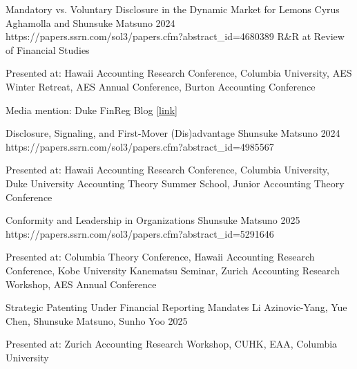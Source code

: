 \paperentry
	{Mandatory vs. Voluntary Disclosure in the Dynamic Market for Lemons}   %
	{Cyrus Aghamolla and Shunsuke Matsuno}   %
	{2024}   %
	{https://papers.ssrn.com/sol3/papers.cfm?abstract_id=4680389}  %
	{}   %
	{R\&R at Review of Financial Studies}   %
	{
	\begin{cvitems}  %
		\item {Presented at: Hawaii Accounting Research Conference\co, Columbia University, AES Winter Retreat\co, AES Annual Conference, Burton Accounting Conference\co} 
		\item {Media mention: Duke FinReg Blog \href{https://sites.duke.edu/thefinregblog/2024/10/29/mandatory-vs-voluntary-disclosure-in-the-dynamic-market-for-lemons/}{[link]}}
	\end{cvitems}
	}
	{}

\paperentry
	{Disclosure, Signaling, and First-Mover (Dis)advantage}   %
	{Shunsuke Matsuno}   %
	{2024}
	{https://papers.ssrn.com/sol3/papers.cfm?abstract_id=4985567}  %
	{}   %
	{}   %
	{
	\begin{cvitems}  %
		\item {Presented at: Hawaii Accounting Research Conference, Columbia University, Duke University Accounting Theory Summer School, Junior Accounting Theory Conference}
	\end{cvitems}
	}
	{}

\paperentry
	{Conformity and Leadership in Organizations}
	{Shunsuke Matsuno}
	{2025}
	{https://papers.ssrn.com/sol3/papers.cfm?abstract_id=5291646}
	{}
	{}
	{
	\begin{cvitems} %
		\item {Presented at: Columbia Theory Conference, Hawaii Accounting Research Conference, Kobe University Kanematsu Seminar, Zurich Accounting Research Workshop, AES Annual Conference}
	\end{cvitems}
	}
	{}

\paperentry
	{Strategic Patenting Under Financial Reporting Mandates}
	{Li Azinovic-Yang, Yue Chen, Shunsuke Matsuno, Sunho Yoo}
	{2025}
	{}
	{}
	{}
	{
	\begin{cvitems} %
		\item {Presented at: Zurich Accounting Research Workshop\co, CUHK\co, EAA\co, Columbia University\co}
	\end{cvitems}
	}
	{}

